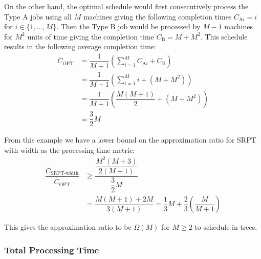 On the other hand, the optimal schedule would first consecutively process the Type A jobs using all $M$ machines giving the following completion times $C_{\text{A}i}=i$ for $i\in\{1,...,M\}$.
Then the Type B job would be processed by $M-1$ machines for $M^2$ units of time giving the completion time $C_\text{B}=M+M^2$.
This schedule results in the following average completion time:
\begin{align}
	\overline{C}_\text{OPT} & = \dfrac{1}{M+1}\left(\sum_{i=1}^M C_{\text{A}i} + C_\text{B}\right) \nonumber \\
	& = \dfrac{1}{M+1}\left(\sum_{i=1}^M i + (M + M^2)\right) \nonumber \\
	& = \dfrac{1}{M+1}\left(\dfrac{M(M+1)}{2} + (M + M^2)\right) \nonumber \\
	& = \dfrac{3}{2}M
\end{align}

From this example we have a lower bound on the approximation ratio for SRPT with width as the processing time metric:
\begin{align}
	\dfrac{\overline{C}_\text{SRPT-width}}{\overline{C}_\text{OPT}} & \geq \dfrac{\dfrac{M^2(M+3)}{2(M+1)}}{\dfrac{3}{2}M} \nonumber \\
	& = \dfrac{M(M+1)+2M}{3(M+1)} = \dfrac{1}{3}M + \dfrac{2}{3}\left(\dfrac{M}{M+1}\right)
\end{align}

This gives the approximation ratio to be $\Omega(M)$ for $M\geq 2$ to schedule in-trees.

\subsubsection{Total Processing Time}
